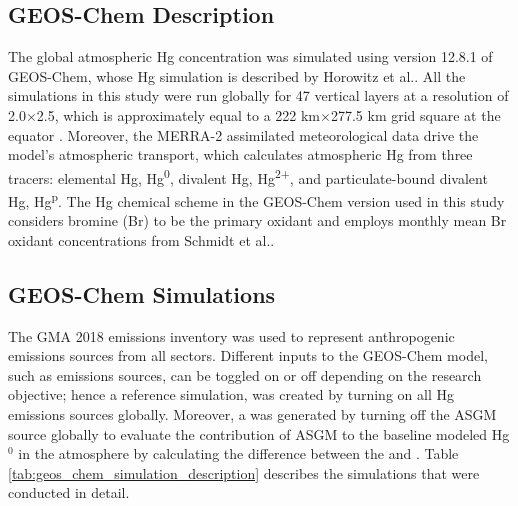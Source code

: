 \subsection{GEOS-Chem Description}\label{c2_geos_chem_description}
\begin{flushleft}

The global atmospheric Hg concentration was simulated using version 12.8.1 of GEOS-Chem, whose Hg simulation is described by Horowitz et al.\cite{horowitz_new_2017}. All the simulations in this study were run globally for 47 vertical layers at a resolution of 2.0$\times$2.5, which is approximately equal to a 222 km$\times$277.5 km grid square at the equator \cite{horowitz_new_2017}. Moreover, the MERRA-2 assimilated meteorological data \cite{gelaro_modern-era_2017} drive the model's atmospheric transport, which calculates atmospheric Hg from three tracers: elemental Hg, Hg\textsuperscript{0}, divalent Hg, Hg\textsuperscript{2+}, and particulate-bound divalent Hg, Hg\textsuperscript{p}. The Hg chemical scheme in the GEOS-Chem version used in this study considers bromine (Br) to be the primary \hg oxidant\cite{horowitz_new_2017} and employs monthly mean Br oxidant concentrations from Schmidt et al.\cite{schmidt_modeling_2016}. 
\end{flushleft}

\begin{flushleft}

\subsection{GEOS-Chem Simulations}\label{c2_geos_chem_simulations}

The GMA 2018 emissions inventory was used to represent anthropogenic emissions sources from all sectors\cite{steenhuisen_development_2019}. Different inputs to the GEOS-Chem model, such as emissions sources, can be toggled on or off depending on the research objective; hence a reference simulation, \on was created by turning on all Hg emissions sources globally. Moreover, a \off was generated by turning off the ASGM source globally to evaluate the contribution of ASGM to the baseline modeled Hg$^0$ in the atmosphere by calculating the difference between the \on and \off. Table \ref{tab:geos_chem_simulation_description} describes the simulations that were conducted in detail.
\end{flushleft}

